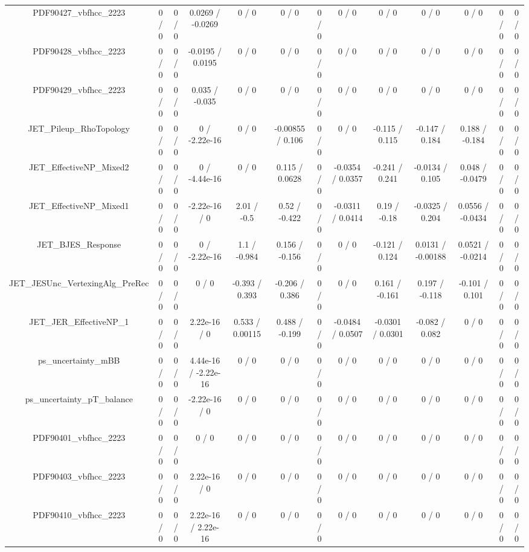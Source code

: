 \documentclass[10pt]{article}
\begin{document}
\begin{table}[htbp]
\begin{center}
\begin{tabular}{|c|c|c|c|c|c|c|c|c|c|c|c|c|}
  PDF90427_vbfhcc_2223 & 0 / 0 & 0 / 0 & 0.0269 / -0.0269 & 0 / 0 & 0 / 0 & 0 / 0 & 0 / 0 & 0 / 0 & 0 / 0 & 0 / 0 & 0 / 0 & 0 / 0 \\ 
  PDF90428_vbfhcc_2223 & 0 / 0 & 0 / 0 & -0.0195 / 0.0195 & 0 / 0 & 0 / 0 & 0 / 0 & 0 / 0 & 0 / 0 & 0 / 0 & 0 / 0 & 0 / 0 & 0 / 0 \\ 
  PDF90429_vbfhcc_2223 & 0 / 0 & 0 / 0 & 0.035 / -0.035 & 0 / 0 & 0 / 0 & 0 / 0 & 0 / 0 & 0 / 0 & 0 / 0 & 0 / 0 & 0 / 0 & 0 / 0 \\ 
  JET_Pileup_RhoTopology & 0 / 0 & 0 / 0 & 0 / -2.22e-16 & 0 / 0 & -0.00855 / 0.106 & 0 / 0 & 0 / 0 & -0.115 / 0.115 & -0.147 / 0.184 & 0.188 / -0.184 & 0 / 0 & 0 / 0 \\ 
  JET_EffectiveNP_Mixed2 & 0 / 0 & 0 / 0 & 0 / -4.44e-16 & 0 / 0 & 0.115 / 0.0628 & 0 / 0 & -0.0354 / 0.0357 & -0.241 / 0.241 & -0.0134 / 0.105 & 0.048 / -0.0479 & 0 / 0 & 0 / 0 \\ 
  JET_EffectiveNP_Mixed1 & 0 / 0 & 0 / 0 & -2.22e-16 / 0 & 2.01 / -0.5 & 0.52 / -0.422 & 0 / 0 & -0.0311 / 0.0414 & 0.19 / -0.18 & -0.0325 / 0.204 & 0.0556 / -0.0434 & 0 / 0 & 0 / 0 \\ 
  JET_BJES_Response & 0 / 0 & 0 / 0 & 0 / -2.22e-16 & 1.1 / -0.984 & 0.156 / -0.156 & 0 / 0 & 0 / 0 & -0.121 / 0.124 & 0.0131 / -0.00188 & 0.0521 / -0.0214 & 0 / 0 & 0 / 0 \\ 
  JET_JESUnc_VertexingAlg_PreRec & 0 / 0 & 0 / 0 & 0 / 0 & -0.393 / 0.393 & -0.206 / 0.386 & 0 / 0 & 0 / 0 & 0.161 / -0.161 & 0.197 / -0.118 & -0.101 / 0.101 & 0 / 0 & 0 / 0 \\ 
  JET_JER_EffectiveNP_1 & 0 / 0 & 0 / 0 & 2.22e-16 / 0 & 0.533 / 0.00115 & 0.488 / -0.199 & 0 / 0 & -0.0484 / 0.0507 & -0.0301 / 0.0301 & -0.082 / 0.082 & 0 / 0 & 0 / 0 & 0 / 0 \\ 
  ps_uncertainty_mBB & 0 / 0 & 0 / 0 & 4.44e-16 / -2.22e-16 & 0 / 0 & 0 / 0 & 0 / 0 & 0 / 0 & 0 / 0 & 0 / 0 & 0 / 0 & 0 / 0 & 0 / 0 \\ 
  ps_uncertainty_pT_balance & 0 / 0 & 0 / 0 & -2.22e-16 / 0 & 0 / 0 & 0 / 0 & 0 / 0 & 0 / 0 & 0 / 0 & 0 / 0 & 0 / 0 & 0 / 0 & 0 / 0 \\ 
  PDF90401_vbfhcc_2223 & 0 / 0 & 0 / 0 & 0 / 0 & 0 / 0 & 0 / 0 & 0 / 0 & 0 / 0 & 0 / 0 & 0 / 0 & 0 / 0 & 0 / 0 & 0 / 0 \\ 
  PDF90403_vbfhcc_2223 & 0 / 0 & 0 / 0 & 2.22e-16 / 0 & 0 / 0 & 0 / 0 & 0 / 0 & 0 / 0 & 0 / 0 & 0 / 0 & 0 / 0 & 0 / 0 & 0 / 0 \\ 
  PDF90410_vbfhcc_2223 & 0 / 0 & 0 / 0 & 2.22e-16 / 2.22e-16 & 0 / 0 & 0 / 0 & 0 / 0 & 0 / 0 & 0 / 0 & 0 / 0 & 0 / 0 & 0 / 0 & 0 / 0 \\ 

\end{tabular}
\end{center}
\end{table}
\end{document}

